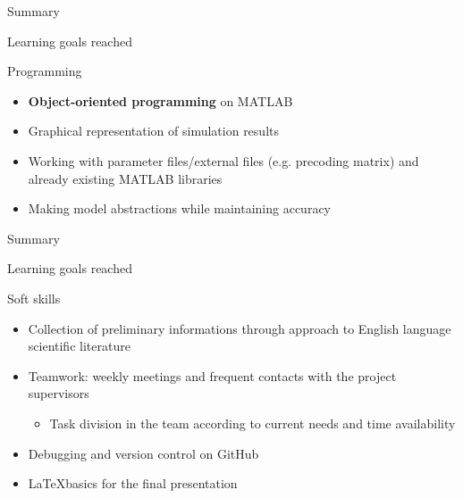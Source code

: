 \documentclass[xcolor={cmyk}]{beamer}
\begin{document}

\begin{frame}{Summary}
	 \begin{block}{Learning goals reached}
	 	 \hspace*{.1\linewidth}\begin{minipage}{.8\linewidth}
    		\begin{block}{Programming}
      			\begin{itemize}
      				\item \textbf{Object-oriented programming} on MATLAB
      				\item Graphical representation of simulation results
      				\item Working with parameter files/external files (e.g. precoding matrix) and already existing MATLAB libraries
      				\item Making model abstractions while maintaining accuracy
      			\end{itemize}
    		\end{block}
    	\end{minipage}
	 \end{block}	 
 \end{frame}

\begin{frame}{Summary}
	 \begin{block}{Learning goals reached}
    	\hspace*{.1\linewidth}\begin{minipage}{.8\linewidth}
    		\begin{block}{Soft skills}
      			\begin{itemize}
      				\item Collection of preliminary informations through approach to English language scientific literature
      				\item Teamwork: weekly meetings and frequent contacts with the project supervisors
      				\begin{itemize}
      					\item Task division in the team according to current needs and time availability
      				\end{itemize}
      				\item Debugging and version control on GitHub
      				\item \LaTeX basics for the final presentation
      			\end{itemize}
    		\end{block}
    	\end{minipage}
	 \end{block}	 
 \end{frame}
\end{document}
